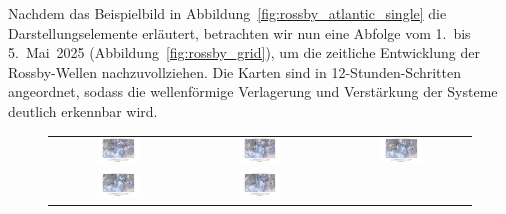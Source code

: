 Nachdem das Beispielbild in Abbildung~\ref{fig:rossby_atlantic_single} die
Darstellungselemente erläutert, betrachten wir nun eine Abfolge vom 1.\ bis 5.\ Mai~2025
(Abbildung~\ref{fig:rossby_grid}), um die zeitliche Entwicklung der Rossby-Wellen
nachzuvollziehen. Die Karten sind in 12-Stunden-Schritten angeordnet, sodass die
wellenförmige Verlagerung und Verstärkung der Systeme deutlich erkennbar wird.


\begin{figure}
	\centering
	\renewcommand{\arraystretch}{0.5}
	\begin{tabular}{ccc}
		\includegraphics[width=0.32\textwidth, trim=3.1cm 3cm 3.0cm 0.8cm, clip]{papers/rossby/images/data_2025_5_1_00_00_500.pdf} &
		\includegraphics[width=0.32\textwidth, trim=3.1cm 3cm 3.0cm 0.8cm, clip]{papers/rossby/images/data_2025_5_1_12_00_500.pdf} &
		\includegraphics[width=0.32\textwidth, trim=3.1cm 3cm 3.0cm 0.8cm, clip]{papers/rossby/images/data_2025_5_2_00_00_500.pdf}   \\
		\includegraphics[width=0.32\textwidth, trim=3.1cm 3cm 3.0cm 0.8cm, clip]{papers/rossby/images/data_2025_5_2_12_00_500.pdf} &
		\includegraphics[width=0.32\textwidth, trim=3.1cm 3cm 3.0cm 0.8cm, clip]{papers/rossby/images/data_2025_5_3_00_00_500.pdf} &

\end{tabular}
\end{figure}
